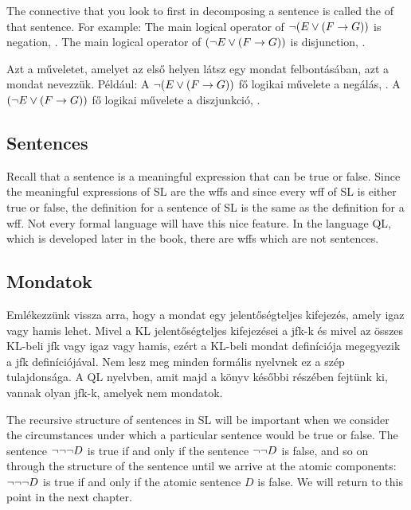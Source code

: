 The connective that you look to first in decomposing a sentence is called the  of that sentence. For example: The main logical operator of $\neg (E \vee (F \rightarrow G))$ is negation, \enot. The main logical operator of $(\neg E \vee (F \rightarrow G))$ is disjunction, \eor.

Azt a műveletet, amelyet az első helyen látsz egy mondat felbontásában, azt a mondat  nevezzük. Például: A $\neg (E \vee (F \rightarrow G))$ fő logikai művelete a negálás, \enot. A $(\neg E \vee (F \rightarrow G))$ fő logikai művelete a diszjunkció, \eor.


\subsection{Sentences}
Recall that a sentence is a meaningful expression that can be true or false. Since the meaningful expressions of SL are the wffs and since every wff of SL is either true or false, the definition for a sentence of SL is the same as the definition for a wff. Not every formal language will have this nice feature. In the language QL, which is developed later in the book, there are wffs which are not sentences. 

\subsection{Mondatok}
Emlékezzünk vissza arra, hogy a mondat egy jelentőségteljes kifejezés, amely igaz vagy hamis lehet. Mivel a KL jelentőségteljes kifejezései a jfk-k és mivel az összes KL-beli jfk vagy igaz vagy hamis, ezért a KL-beli mondat definíciója megegyezik a jfk definíciójával. Nem lesz meg minden formális nyelvnek ez a szép tulajdonsága. A QL nyelvben, amit majd a könyv későbbi részében fejtünk ki, vannak olyan jfk-k, amelyek nem mondatok. 



The recursive structure of sentences in SL will be important when we consider the circumstances under which a particular sentence would be true or false. The sentence $\neg \neg \neg D$ is true if and only if the sentence $\neg \neg D$ is false, and so on through the structure of the sentence until we arrive at the atomic components: $\neg \neg \neg D$ is true if and only if the atomic sentence $D$ is false. We will return to this point in the next chapter.




